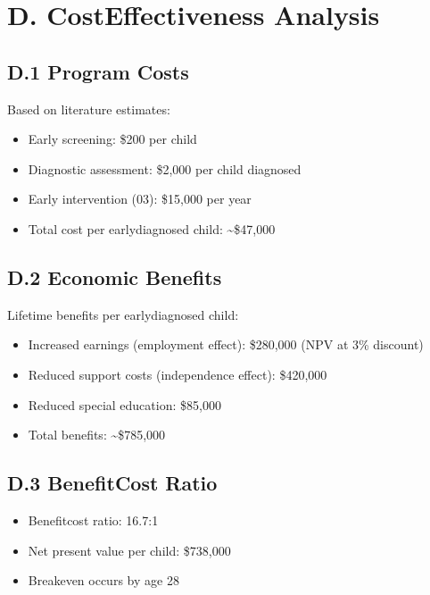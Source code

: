 \documentclass[letterpaper,10pt,english]{jupyterBook}
\begin{document}
\section{D. Cost\sphinxhyphen{}Effectiveness Analysis}
\label{\detokenize{appendix:d-cost-effectiveness-analysis}}

\subsection{D.1 Program Costs}
\label{\detokenize{appendix:d-1-program-costs}}
\sphinxAtStartPar
Based on literature estimates:
\begin{itemize}
\item {} 
\sphinxAtStartPar
Early screening: \$200 per child

\item {} 
\sphinxAtStartPar
Diagnostic assessment: \$2,000 per child diagnosed

\item {} 
\sphinxAtStartPar
Early intervention (0\sphinxhyphen{}3): \$15,000 per year

\item {} 
\sphinxAtStartPar
Total cost per early\sphinxhyphen{}diagnosed child: \textasciitilde{}\$47,000

\end{itemize}


\subsection{D.2 Economic Benefits}
\label{\detokenize{appendix:d-2-economic-benefits}}
\sphinxAtStartPar
Lifetime benefits per early\sphinxhyphen{}diagnosed child:
\begin{itemize}
\item {} 
\sphinxAtStartPar
Increased earnings (employment effect): \$280,000 (NPV at 3\% discount)

\item {} 
\sphinxAtStartPar
Reduced support costs (independence effect): \$420,000

\item {} 
\sphinxAtStartPar
Reduced special education: \$85,000

\item {} 
\sphinxAtStartPar
Total benefits: \textasciitilde{}\$785,000

\end{itemize}


\subsection{D.3 Benefit\sphinxhyphen{}Cost Ratio}
\label{\detokenize{appendix:d-3-benefit-cost-ratio}}\begin{itemize}
\item {} 
\sphinxAtStartPar
Benefit\sphinxhyphen{}cost ratio: 16.7:1

\item {} 
\sphinxAtStartPar
Net present value per child: \$738,000

\item {} 
\sphinxAtStartPar
Break\sphinxhyphen{}even occurs by age 28

\end{itemize}
\end{document}
